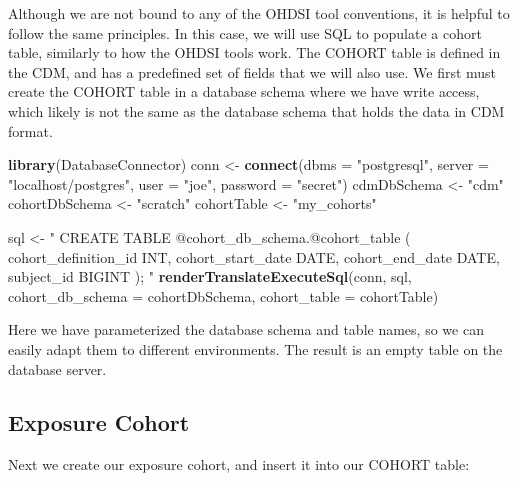 \documentclass[11pt]{book}
\newenvironment{Shaded}{\begin{snugshade}}{\end{snugshade}}
\newcommand{\KeywordTok}[1]{\textcolor[rgb]{0.13,0.29,0.53}{\textbf{#1}}}
\newcommand{\DataTypeTok}[1]{\textcolor[rgb]{0.13,0.29,0.53}{#1}}
\newcommand{\StringTok}[1]{\textcolor[rgb]{0.31,0.60,0.02}{#1}}
\newcommand{\NormalTok}[1]{#1}
\theoremstyle{definition}
\theoremstyle{definition}
\theoremstyle{definition}
\theoremstyle{remark}
\begin{document}
Although we are not bound to any of the OHDSI tool conventions, it is
helpful to follow the same principles. In this case, we will use SQL to
populate a cohort table, similarly to how the OHDSI tools work. The
COHORT table is defined in the CDM, and has a predefined set of fields
that we will also use. We first must create the COHORT table in a
database schema where we have write access, which likely is not the same
as the database schema that holds the data in CDM format.

\begin{Shaded}
\begin{Highlighting}[]
\KeywordTok{library}\NormalTok{(DatabaseConnector)}
\NormalTok{conn <-}\StringTok{ }\KeywordTok{connect}\NormalTok{(}\DataTypeTok{dbms =} \StringTok{"postgresql"}\NormalTok{,}
                \DataTypeTok{server =} \StringTok{"localhost/postgres"}\NormalTok{,}
                \DataTypeTok{user =} \StringTok{"joe"}\NormalTok{,}
                \DataTypeTok{password =} \StringTok{"secret"}\NormalTok{)}
\NormalTok{cdmDbSchema <-}\StringTok{ "cdm"}
\NormalTok{cohortDbSchema <-}\StringTok{ "scratch"}
\NormalTok{cohortTable <-}\StringTok{ "my_cohorts"}

\NormalTok{sql <-}\StringTok{ "}
\StringTok{CREATE TABLE @cohort_db_schema.@cohort_table (}
\StringTok{  cohort_definition_id INT,}
\StringTok{  cohort_start_date DATE,}
\StringTok{  cohort_end_date DATE,}
\StringTok{  subject_id BIGINT}
\StringTok{);}
\StringTok{"}
\KeywordTok{renderTranslateExecuteSql}\NormalTok{(conn, sql,}
                          \DataTypeTok{cohort_db_schema =}\NormalTok{ cohortDbSchema,}
                          \DataTypeTok{cohort_table =}\NormalTok{ cohortTable)}
\end{Highlighting}
\end{Shaded}

Here we have parameterized the database schema and table names, so we
can easily adapt them to different environments. The result is an empty
table on the database server.

\subsection{Exposure Cohort}\label{exposure-cohort}

Next we create our exposure cohort, and insert it into our COHORT table:
\end{document}
